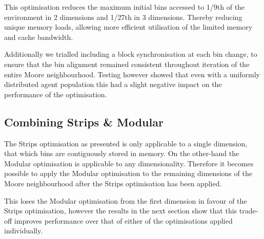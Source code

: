     This optimisation reduces the maximum initial bins accessed to 1/9th of the environment in 2 dimensions and 1/27th in 3 dimensions. Thereby reducing unique memory loads, allowing more efficient utilisation of the limited memory and cache bandwidth.
    
    Additionally we trialled including a block synchronisation at each bin change, to ensure that the bin alignment remained consistent throughout iteration of the entire Moore neighbourhood. Testing however showed that even with a uniformly distributed agent population this had a slight negative impact on the performance of the optimisation.

  \subsection{Combining Strips \& Modular}
    The Strips optimisation as presented is only applicable to a single dimension, that which bins are contiguously stored in memory. On the other-hand the Modular optimisation is applicable to any dimensionality. Therefore it becomes possible to apply the Modular optimisation to the remaining dimensions of the Moore neighbourhood after the Strips optimisation has been applied.
    
    This loses the Modular optimisation from the first dimension in favour of the Strips optimisation, however the results in the next section show that this trade-off improves performance over that of either of the optimisations applied individually.
    
